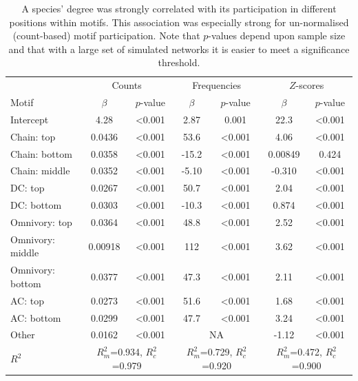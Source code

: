 \documentclass[12pt]{article}
\begin{document}
			\begin{table}[hb!]
    			\caption{A species' degree was strongly correlated with its participation in different positions within motifs. This association was especially strong for un-normalised (count-based) motif participation. Note that $p$-values depend upon sample size and that with a large set of simulated networks it is easier to meet a significance threshold.}
    			\label{tab:positions_vs_deg}
    			\begin{tabular}{l | c c | c c | c c}
    			& \multicolumn{2}{c|}{Counts} & \multicolumn{2}{c}{Frequencies} & \multicolumn{2}{|c}{$Z$-scores} \\
    			Motif & $\beta$ & $p$-value & $\beta$ & $p$-value & $\beta$ & $p$-value \\
    			\hline
                Intercept	&	4.28	&	\textless0.001	&	2.87	&	0.001	&	22.3	&	\textless0.001	\\
                Chain: top	&	0.0436	&	\textless0.001	&	53.6	&	\textless0.001	&	4.06	&	\textless0.001	\\
                Chain: bottom	&	0.0358	&	\textless0.001	&	-15.2	&	\textless0.001	&	0.00849	&	0.424	\\
                Chain: middle	&	0.0352	&	\textless0.001	&	-5.10	&	\textless0.001	&	-0.310	&	\textless0.001	\\
                DC: top	&	0.0267	&	\textless0.001	&	50.7	&	\textless0.001	&	2.04	&	\textless0.001	\\
                DC: bottom	&	0.0303	&	\textless0.001	&	-10.3	&	\textless0.001	&	0.874	&	\textless0.001	\\
                Omnivory: top	&	0.0364	&	\textless0.001	&	48.8	&	\textless0.001	&	2.52	&	\textless0.001	\\
                Omnivory: middle	&	0.00918 	&	\textless0.001	&	112	&	\textless0.001	&	3.62	&	\textless0.001	\\
                Omnivory: bottom	&	0.0377	&	\textless0.001	&	47.3	&	\textless0.001	&	2.11	&	\textless0.001	\\
                AC: top	&	0.0273	&	\textless0.001	&	51.6	&	\textless0.001	&	1.68	&	\textless0.001	\\
                AC: bottom	&	0.0299	&	\textless0.001	&	47.7	&	\textless0.001	&	3.24	&	\textless0.001	\\
                Other	&	0.0162	&	\textless0.001	& \multicolumn{2}{c|}{NA} &	-1.12	&	\textless0.001	\\
    			\hline
    			$R^2$ & \multicolumn{2}{c|}{\tiny{$R^2_m$=0.934, $R^2_c$=0.979}} & \multicolumn{2}{c}{\tiny{$R^2_m$=0.729, $R^2_c$=0.920}} & \multicolumn{2}{|c}{\tiny{$R^2_m$=0.472, $R^2_c$=0.900}} \\
    			\hline
                \end{tabular}
                \end{table}
\end{document}
